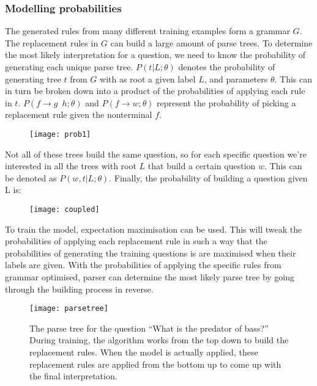 \subsubsection{Modelling probabilities}
The generated rules from many different training examples form a grammar $G$. The replacement rules in $G$ can build a large amount of parse trees. To determine the most likely interpretation for a question, we need to know the probability of generating each unique parse tree. $P(t|L; \theta)$ denotes the probability of generating tree $t$ from $G$ with as root a given label $L$, and parameters $\theta$. This can in turn be broken down into a product of the probabilities of applying each rule in $t$. $ P(f \rightarrow g \enspace h; \theta)$ and $ P(f \rightarrow w; \theta)$ represent the probability of picking a replacement rule given the nonterminal $f$.

\begin{figure}[H]
\begin{center}
\texttt{[image: prob1]}
\end{center}
\label{fig:prob1}
\end{figure}

Not all of these trees build the same question, so for each specific question we're interested in all the trees with root $L$ that build a certain question $w$. This can be denoted as $P(w, t|L; \theta)$. Finally, the probability of building a question given L is:

\begin{figure}[H]
\begin{center}
\texttt{[image: coupled]}
\end{center}
\label{fig:coupled}
\end{figure}

To train the model, expectation maximisation can be used. This will tweak the probabilities of applying each replacement rule in such a way that the probabilities of generating the training questions is are maximised when their labels are given. With the probabilities of applying the specific rules from grammar optimised, parser can determine the most likely parse tree by going through the building process in reverse.

\begin{figure}[H]
\texttt{[image: parsetree]}
\caption{The parse tree for the question ``What is the predator of bass?'' During training, the algorithm works from the top down to build the replacement rules. When the model is actually applied, these replacement rules are applied from the bottom up to come up with the final interpretation.}\label{fig:parsetree}
\end{figure}

